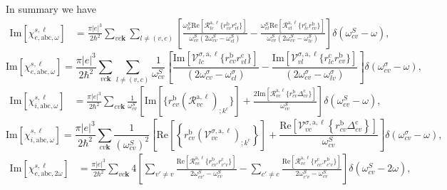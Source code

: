 In summary we have
\begin{align}\label{imchiew}
\mathrm{Im}[\chi_{e,\mathrm{a}\mathrm{b}\mathrm{c},\omega}^{s,\ell}]
&=
\frac{\pi |e|^3}{2\hbar^2} 
\sum_{vc\mathbf{k}}
\sum_{l\neq(v,c)}
\left[
\frac{\omega^S_{lc}\mathrm{Re}[\mathcal{R}^{\mathrm{a},\ell}_{lc}\{r^{\mathrm{b}}_{cv}r^{\mathrm{c}}_{vl}\}]}
{\omega^S_{cv}(2\omega^S_{cv}-\omega^S_{cl})}
-
\frac{\omega^S_{vl}\mathrm{Re}[\mathcal{R}^{\mathrm{a},\ell}_{vl}\{r^{\mathrm{c}}_{lc}r^{\mathrm{b}}_{cv}\}]}
{\omega^S_{cv}(2\omega^S_{cv}-\omega^S_{lv})}
\right]
\delta(\omega^S_{cv}-\omega)
,
\end{align}  
\begin{equation}\label{c-calvimchiewn}
\mathrm{Im}[\chi_{e,\mathrm{a}\mathrm{b}\mathrm{c},\omega}^{s,\ell}] =
\frac{\pi |e|^3}{2\hbar^2}\sum_{vc\mathbf{k}}\sum_{l\neq(v,c)}\frac{1}{\omega^{S}_{cv}}
\left[
\frac{\mathrm{Im}[\mathcal{V}^{\sigma,\text{a},\ell}_{lc}\{r^{\mathrm{b}}_{cv}r^{\mathrm{c}}_{vl}\}]}
{(2\omega^\sigma_{cv}-\omega^\sigma_{cl})} 
-\frac{\mathrm{Im}[\mathcal{V}^{\sigma,\text{a},\ell}_{vl}\{r^{\mathrm{c}}_{lc}r^{\mathrm{b}}_{cv}\}]}
{(2\omega^\sigma_{cv}-\omega^\sigma_{lv})}
\right]\delta(\omega^\sigma_{cv}-\omega),
\end{equation}  
\begin{align}\label{imchiwf}
\mathrm{Im}[\chi_{i,\mathrm{a}\mathrm{b}\mathrm{c},\omega}^{s,\ell}]
&=
\frac{\pi|e|^3}{2\hbar^2}
\sum_{cv\mathbf{k}}
\frac{1}{\omega^S_{cv}}
\left[
\mathrm{Im}[\{r^{\mathrm{b}}_{cv}\left(\mathcal{R}^{\mathrm{a},\ell}_{vc}\right)_{;k^{\mathrm{c}}}\}]
+
\frac{2\mathrm{Im}[\mathcal{R}^{\mathrm{a},\ell}_{vc}\{r^{\mathrm{b}}_{cv}\Delta^{\mathrm{c}}_{cv}\}]}{\omega^S_{cv}}
\right]
\delta(\omega^S_{cv}-\omega)
,
\end{align}
\begin{equation}\label{c-calvimchiwn}
\mathrm{Im}[\chi_{i,\text{a}\text{b}\text{c},\omega}^{s,\ell}]
= \frac{\pi\vert e\vert^3}{2\hbar^2}\sum_{cv\mathbf{k}}\frac{1}{(\omega^{S}_{cv})^{2}}
\left[
\mathrm{Re}\left[\left\{r^{\text{b}}_{cv}\left(\mathcal{V}^{\sigma,\text{a},\ell}_{vc}\right)_{;k^{\text{c}}}\right\}\right]
+\frac{\mathrm{Re}\left[\mathcal{V}^{\sigma,\text{a},\ell}_{vc}\left\{r^{\text{b}}_{cv}
\Delta^{\text{c}}_{cv}\right\}\right]}{\omega^{S}_{cv}} 
\right]\delta(\omega^\sigma_{cv}-\omega),
\end{equation}
\begin{align}\label{imchie2w}
\mathrm{Im}[\chi_{e,\mathrm{a}\mathrm{b}\mathrm{c},2\omega}^{s,\ell}]
&=
\frac{\pi |e|^3}{2\hbar^2} 
\sum_{vc\mathbf{k}} 
4
\left[
\sum_{v'\ne v}
\frac{\mathrm{Re}[\mathcal{R}^{\mathrm{a},\ell}_{vc}\{r^{\mathrm{b}}_{cv'}r^{\mathrm{c}}_{v'v}\}]}{2\omega^S_{cv'}-\omega^S_{cv}}
-
\sum_{c'\ne c}
\frac{\mathrm{Re}[\mathcal{R}^{\mathrm{a},\ell}_{vc}\{r^{\mathrm{c}}_{cc'}r^{\mathrm{b}}_{c'v}\}]}
{2\omega^S_{c'v}-\omega^S_{cv}}
\right]
\delta(\omega^S_{cv}-2\omega)
,
\end{align}  
